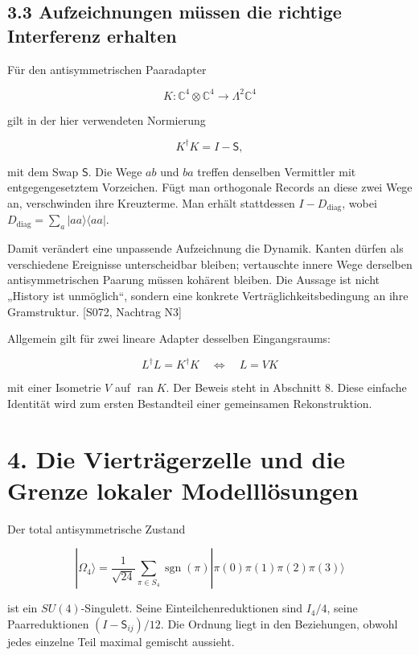 \subsection{3.3 Aufzeichnungen müssen die richtige Interferenz
erhalten}\label{aufzeichnungen-muxfcssen-die-richtige-interferenz-erhalten}

Für den antisymmetrischen Paaradapter

\[K:\mathbb C^4\otimes\mathbb C^4\longrightarrow\Lambda^2\mathbb C^4\]

gilt in der hier verwendeten Normierung

\[K^\dagger K=I-\mathsf S,\]

mit dem Swap \(\mathsf S\). Die Wege \(ab\) und \(ba\) treffen denselben
Vermittler mit entgegengesetztem Vorzeichen. Fügt man orthogonale
Records an diese zwei Wege an, verschwinden ihre Kreuzterme. Man erhält
stattdessen \(I-D_{\mathrm{diag}}\), wobei
\(D_{\mathrm{diag}}=\sum_a|aa\rangle\langle aa|\).

Damit verändert eine unpassende Aufzeichnung die Dynamik. Kanten dürfen
als verschiedene Ereignisse unterscheidbar bleiben; vertauschte innere
Wege derselben antisymmetrischen Paarung müssen kohärent bleiben. Die
Aussage ist nicht „History ist unmöglich``, sondern eine konkrete
Verträglichkeitsbedingung an ihre Gramstruktur. {[}S072, Nachtrag N3{]}

Allgemein gilt für zwei lineare Adapter desselben Eingangsraums:

\[L^\dagger L=K^\dagger K
\quad\Longleftrightarrow\quad L=VK\]

mit einer Isometrie \(V\) auf \(\operatorname{ran}K\). Der Beweis steht
in Abschnitt 8. Diese einfache Identität wird zum ersten Bestandteil
einer gemeinsamen Rekonstruktion.

\section{4. Die Vierträgerzelle und die Grenze lokaler
Modelllösungen}\label{die-viertruxe4gerzelle-und-die-grenze-lokaler-modellluxf6sungen}

Der total antisymmetrische Zustand

\[|\Omega_4\rangle=\frac1{\sqrt{24}}
\sum_{\pi\in S_4}\operatorname{sgn}(\pi)
|\pi(0)\pi(1)\pi(2)\pi(3)\rangle\]

ist ein \(SU(4)\)-Singulett. Seine Einteilchenreduktionen sind
\(I_4/4\), seine Paarreduktionen \((I-\mathsf S_{ij})/12\). Die Ordnung
liegt in den Beziehungen, obwohl jedes einzelne Teil maximal gemischt
aussieht.

